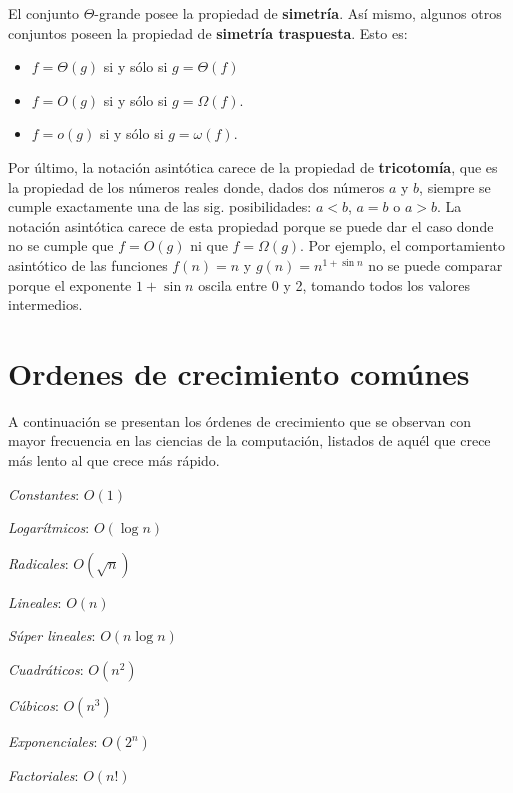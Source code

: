 
El conjunto $\Theta$-grande posee la propiedad de \textbf{simetría}.
Así mismo, algunos otros conjuntos poseen la propiedad de \textbf{simetría traspuesta}.
Esto es:
\begin{itemize}
  \item \(f=\Theta(g)\) si y sólo si \(g=\Theta(f)\)
  \item \(f=O(g)\) si y sólo si \(g=\Omega(f)\).
  \item \(f=o(g)\) si y sólo si \(g=\omega(f)\).
\end{itemize}

Por último, la notación asintótica carece de la propiedad de \textbf{tricotomía}, que es la propiedad de los números reales donde, dados dos números $a$ y $b$, siempre se cumple exactamente una de las sig. posibilidades: $a<b$, $a=b$ o $a>b$. 
La notación asintótica carece de esta propiedad porque se puede dar el caso donde no se cumple que \(f=O(g)\) ni que \(f=\Omega(g)\).
Por ejemplo, el comportamiento asintótico de las funciones \(f(n)=n\) y \(g(n)=n^{1+\sin{n}}\) no se puede comparar porque el exponente $1+\sin{n}$ oscila entre 0 y 2, tomando todos los valores intermedios.

\section{Ordenes de crecimiento comúnes}

A continuación se presentan los órdenes de crecimiento que se observan con mayor frecuencia en las ciencias de la computación, listados de aquél que crece más lento al que crece más rápido.

\begin{enumerate}
  \begin{multicols}{2}
    \item \emph{Constantes}: \(O(1)\)
    \item \emph{Logarítmicos}: \(O(\log n)\)
    \item \emph{Radicales}: \(O(\sqrt{n})\)
    \item \emph{Lineales}: \(O(n)\)
    \item \emph{Súper lineales}: \(O(n\log n)\)
    \item \emph{Cuadráticos}: \(O(n^{2})\)
    \item \emph{Cúbicos}: \(O(n^{3})\)
    \item \emph{Exponenciales}: \(O(2^{n})\)
    \item \emph{Factoriales}: \(O(n!)\)
  \end{multicols}
\end{enumerate}

